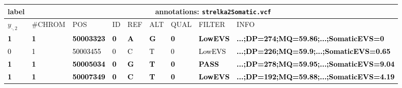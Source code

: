 \begin{tabular}{|l|llllllll|}
\hline
\footnotesize label &
\multicolumn{8}{|c|}{\footnotesize annotations: \texttt{strelka2Somatic.vcf}} \\
\hline
\(y_{\cdot,2}\) & \#CHROM & POS & ID & REF & ALT & QUAL & FILTER & INFO \\
\bfseries \textcolor{black}{1} &
\bfseries \textcolor{black}{1} &
\bfseries \textcolor{black}{50003323} &
\bfseries \textcolor{black}{0} &
\bfseries \textcolor{black}{A} &
\bfseries \textcolor{black}{G} &
\bfseries \textcolor{black}{0} &
\bfseries \textcolor{black}{LowEVS} &
\bfseries \textcolor{black}{...;DP=274;MQ=59.86;...;SomaticEVS=0} \\
\textcolor{black}{0} &
\textcolor{black}{1} &
\textcolor{black}{50003455} &
\textcolor{black}{0} &
\textcolor{black}{C} &
\textcolor{black}{T} &
\textcolor{black}{0} &
\textcolor{black}{LowEVS} &
\bfseries \textcolor{black}{...;DP=226;MQ=59.9;...;SomaticEVS=0.65} \\
\bfseries \textcolor{black}{1} &
\bfseries \textcolor{black}{1} &
\bfseries \textcolor{black}{50005034} &
\bfseries \textcolor{black}{0} &
\bfseries \textcolor{black}{G} &
\bfseries \textcolor{black}{T} &
\bfseries \textcolor{black}{0} &
\bfseries \textcolor{black}{PASS} &
\bfseries \textcolor{black}{...;DP=278;MQ=59.95;...;SomaticEVS=9.04} \\
\bfseries \textcolor{black}{1} &
\bfseries \textcolor{black}{1} &
\bfseries \textcolor{black}{50007349} &
\bfseries \textcolor{black}{0} &
\bfseries \textcolor{black}{C} &
\bfseries \textcolor{black}{T} &
\bfseries \textcolor{black}{0} &
\bfseries \textcolor{black}{LowEVS} &
\bfseries \textcolor{black}{...;DP=192;MQ=59.88;...;SomaticEVS=4.19} \\
\hline
\end{tabular}
\normalsize
